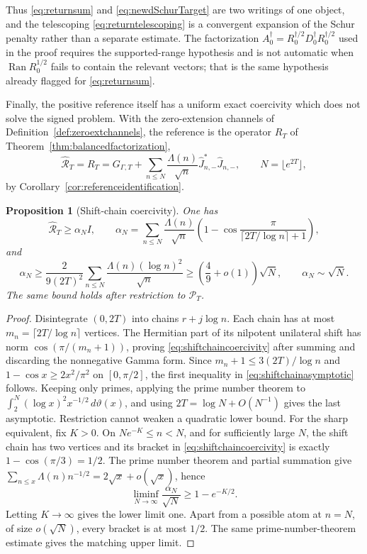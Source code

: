 \documentclass[11pt]{amsart}
\newtheorem{proposition}[theorem]{Proposition}
\theoremstyle{definition}
\theoremstyle{remark}
\begin{document}
Thus \eqref{eq:returnsum} and \eqref{eq:newdSchurTarget} are two writings of
one object, and the telescoping \eqref{eq:returntelescoping} is a convergent
expansion of the Schur penalty rather than a separate estimate.  The
factorization \(A_0^\dagger=R_0^{\dagger/2}D_0^\dagger R_0^{\dagger/2}\) used
in the proof requires the supported-range hypothesis and is not automatic
when \(\operatorname{Ran}R_0^{1/2}\) fails to contain the relevant vectors;
that is the same hypothesis already flagged for \eqref{eq:returnsum}.

Finally, the positive reference itself has a uniform exact coercivity which
does not solve the signed problem.  With the zero-extension channels of
Definition~\ref{def:zeroextchannels}, the reference is the operator
\(R_T\) of Theorem~\ref{thm:balancedfactorization},
\[
 \widehat{\mathcal R}_T=R_T=G_{\Gamma,T}
 +\sum_{n\le N}\frac{\Lambda(n)}{\sqrt n}
       \widehat J_{n,-}^*\widehat J_{n,-},
 \qquad N=\lfloor e^{2T}\rfloor ,
\]
by Corollary~\ref{cor:referenceidentification}.

\begin{proposition}[Shift-chain coercivity]\label{prop:shiftchaincoercivity}
One has
\begin{equation}\label{eq:shiftchaincoercivity}
 \widehat{\mathcal R}_T\ge \alpha_N I,\qquad
 \alpha_N=\sum_{n\le N}\frac{\Lambda(n)}{\sqrt n}
 \left(1-\cos\frac{\pi}{\lceil2T/\log n\rceil+1}\right),
\end{equation}
and
\begin{equation}\label{eq:shiftchainasymptotic}
 \alpha_N\ge \frac{2}{9(2T)^2}
 \sum_{n\le N}\frac{\Lambda(n)(\log n)^2}{\sqrt n}
 \ge\left(\frac49+o(1)\right)\sqrt N,
 \qquad \alpha_N\sim\sqrt N.
\end{equation}
The same bound holds after restriction to \(\mathcal P_T\).
\end{proposition}

\begin{proof}
Disintegrate \((0,2T)\) into chains \(r+j\log n\).  Each chain has at most
\(m_n=\lceil2T/\log n\rceil\) vertices.  The Hermitian part of its nilpotent
unilateral shift has norm \(\cos(\pi/(m_n+1))\), proving
\eqref{eq:shiftchaincoercivity} after summing and discarding the nonnegative
Gamma form.  Since \(m_n+1\le3(2T)/\log n\) and
\(1-\cos x\ge2x^2/\pi^2\) on \([0,\pi/2]\), the first inequality in
\eqref{eq:shiftchainasymptotic} follows.  Keeping only primes, applying the
prime number theorem to
\(\int_2^N(\log x)^2x^{-1/2}\,d\vartheta(x)\), and using
\(2T=\log N+O(N^{-1})\) gives the last asymptotic.  Restriction cannot weaken
a quadratic lower bound.  For the sharp equivalent, fix \(K>0\).  On
\(Ne^{-K}\le n<N\), and for sufficiently large \(N\), the shift chain has
two vertices and its bracket in \eqref{eq:shiftchaincoercivity} is exactly
\(1-\cos(\pi/3)=1/2\).  The prime number theorem and partial summation give
\(\sum_{n\le x}\Lambda(n)n^{-1/2}=2\sqrt x+o(\sqrt x)\), hence
\[
 \liminf_{N\to\infty}\frac{\alpha_N}{\sqrt N}\ge1-e^{-K/2}.
\]
Letting \(K\to\infty\) gives the lower limit one.  Apart from a possible
atom at \(n=N\), of size \(o(\sqrt N)\), every bracket is at most \(1/2\).
The same prime-number-theorem estimate gives the matching upper limit.
\end{proof}
\end{document}
